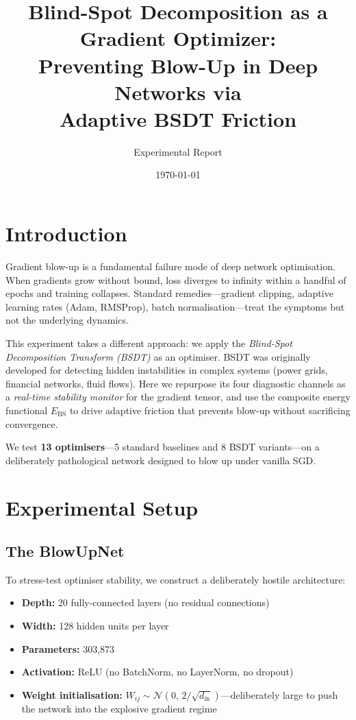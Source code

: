 \documentclass[11pt,a4paper]{article}
\title{\textbf{Blind-Spot Decomposition as a Gradient Optimizer:\\
  Preventing Blow-Up in Deep Networks via\\
  Adaptive BSDT Friction}}
\author{Experimental Report}
\date{\today}
\begin{document}
\maketitle

\section{Introduction}

Gradient blow-up is a fundamental failure mode of deep network optimisation.
When gradients grow without bound, loss diverges to infinity within a handful of
epochs and training collapses.  Standard remedies---gradient clipping, adaptive
learning rates (Adam, RMSProp), batch normalisation---treat the symptoms but not
the underlying dynamics.

This experiment takes a different approach: we apply the \emph{Blind-Spot
Decomposition Transform (BSDT)} as an optimiser.  BSDT was originally developed
for detecting hidden instabilities in complex systems (power grids, financial
networks, fluid flows).  Here we repurpose its four diagnostic channels as a
\emph{real-time stability monitor} for the gradient tensor, and use the
composite energy functional $E_{\mathrm{BS}}$ to drive adaptive friction that
prevents blow-up without sacrificing convergence.

We test \textbf{13 optimisers}---5 standard baselines and 8 BSDT
variants---on a deliberately pathological network designed to blow up under
vanilla SGD.

\section{Experimental Setup}

\subsection{The BlowUpNet}

To stress-test optimiser stability, we construct a deliberately hostile
architecture:

\begin{itemize}[nosep]
  \item \textbf{Depth:} 20 fully-connected layers (no residual connections)
  \item \textbf{Width:} 128 hidden units per layer
  \item \textbf{Parameters:} 303,873
  \item \textbf{Activation:} ReLU (no BatchNorm, no LayerNorm, no dropout)
  \item \textbf{Weight initialisation:} $W_{ij} \sim \mathcal{N}(0, \, 2/\sqrt{d_{\mathrm{in}}})$---deliberately large to push the network into the explosive gradient regime
\end{itemize}
\end{document}
